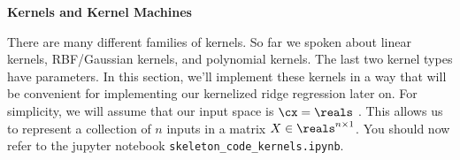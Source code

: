 \documentclass{article}
\newcommand{\nyuparagraph}[1]{\textcolor{nyupurple}{\large #1}}
\theoremstyle{plain}
\theoremstyle{definition}
\begin{document}

\vspace{0.3in}
\nyuparagraph{\bf Kernels and Kernel Machines}

There are many different families of kernels. So far we spoken
about linear kernels, RBF/Gaussian kernels, and polynomial kernels.
The last two kernel types have parameters. In this section, we'll
implement these kernels in a way that will be convenient for implementing
our kernelized ridge regression later on. For simplicity,
we will assume that our input space is $\cx=\reals$
.
 This allows
us to represent a collection of $n$ inputs in a matrix $X\in\reals^{n\times 1}$. 
You should now refer to the jupyter notebook \texttt{skeleton\_code\_kernels.ipynb}.
\end{document}
